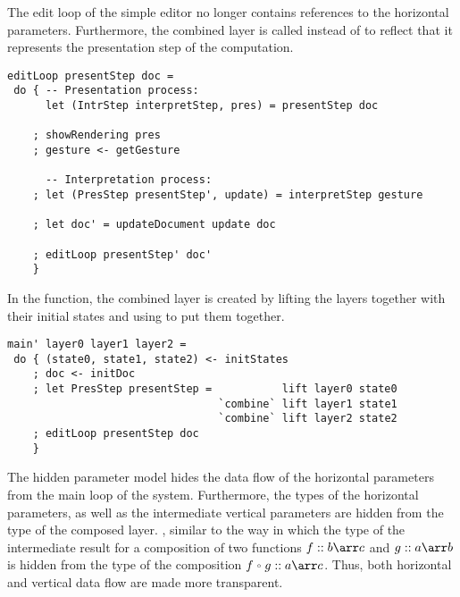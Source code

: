 \documentclass[preprint,natbib]{sigplanconf}
\begin{document}

The edit loop of the simple editor no longer contains references to the horizontal parameters. Furthermore, the combined layer is called  instead of  to reflect that it represents the presentation step of the computation.

\begin{small}
\begin{verbatim}
editLoop presentStep doc = 
 do { -- Presentation process:
      let (IntrStep interpretStep, pres) = presentStep doc

    ; showRendering pres
    ; gesture <- getGesture
    
      -- Interpretation process:
    ; let (PresStep presentStep', update) = interpretStep gesture
    
    ; let doc' = updateDocument update doc
    
    ; editLoop presentStep' doc'
    }
\end{verbatim}
\end{small}

In the  function, the combined layer is created by lifting the layers together with their initial states and using  to put them together.

\begin{small}
\begin{verbatim}
main' layer0 layer1 layer2 =
 do { (state0, state1, state2) <- initStates
    ; doc <- initDoc 
    ; let PresStep presentStep =           lift layer0 state0 
                                 `combine` lift layer1 state1
                                 `combine` lift layer2 state2
    ; editLoop presentStep doc
    }
\end{verbatim}
\end{small}


The hidden parameter model hides the data flow of the horizontal parameters from the main loop of the system. Furthermore, the types of the horizontal parameters, as well as the intermediate vertical parameters are hidden from the type of the composed layer. \bc, similar to the way in which the type of the intermediate result for a composition of two functions $f :: b \arr c$ and $g :: a \arr b$ is hidden from the type of the composition $f \oo g :: a \arr c$. \ec Thus, both horizontal and vertical data flow are made more transparent. 

\end{document}
